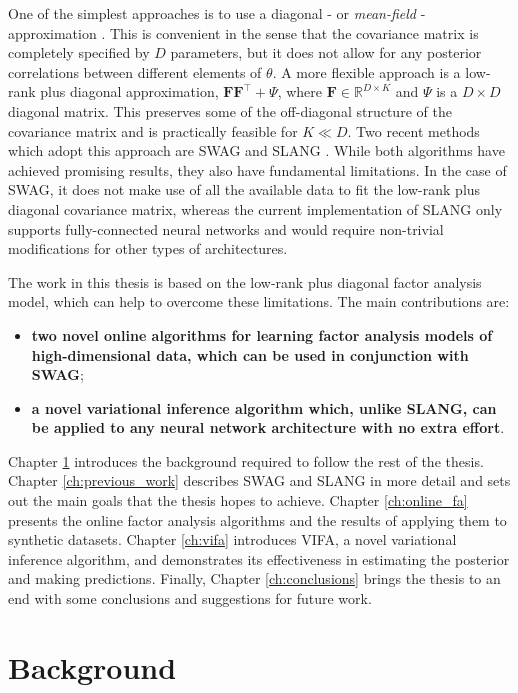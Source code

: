 \documentclass[msc,deptreport.inf]{infthesis} %
\newcommand{\matr}[1]{\mathbf{#1}}
\newcommand{\R}{\mathbb R}
\begin{document}
One of the simplest approaches is to use a diagonal - or \emph{mean-field} - approximation \cite{blundell2015, graves2011, hernandez2015, tangkaratt2018, ranganath2014}. This is convenient in the sense that the covariance matrix is completely specified by $D$ parameters, but it does not allow for any posterior correlations between different elements of $\theta$. A more flexible approach is a low-rank plus diagonal approximation, $\matr{F}\matr{F}^\intercal + \Psi$, where $\matr{F} \in \R^{D\times K}$ and $\Psi$ is a $D \times D$ diagonal matrix. This preserves some of the off-diagonal structure of the covariance matrix and is practically feasible for $K \ll D$. Two recent methods which adopt this approach are SWAG \cite{maddox2019} and SLANG \cite{mishkin2018}. While both algorithms have achieved promising results, they also have fundamental limitations. In the case of SWAG, it does not make use of all the available data to fit the low-rank plus diagonal covariance matrix, whereas the current implementation of SLANG only supports fully-connected neural networks and would require non-trivial modifications for other types of architectures.

The work in this thesis is based on the low-rank plus diagonal factor analysis model, which can help to overcome these limitations. The main contributions are:
\begin{itemize}
	\item \textbf{two novel online algorithms for learning factor analysis models of high-dimensional data, which can be used in conjunction with SWAG};
	\item \textbf{a novel variational inference algorithm which, unlike SLANG, can be applied to any neural network architecture with no extra effort}. 
\end{itemize} 
Chapter \ref{ch:background} introduces the background required to follow the rest of the thesis. Chapter \ref{ch:previous_work} describes SWAG and SLANG in more detail and sets out the main goals that the thesis hopes to achieve. Chapter \ref{ch:online_fa} presents the online factor analysis algorithms and the results of applying them to synthetic datasets. Chapter \ref{ch:vifa} introduces VIFA, a novel variational inference algorithm, and demonstrates its effectiveness in estimating the posterior and making predictions. Finally, Chapter \ref{ch:conclusions} brings the thesis to an end with some conclusions and suggestions for future work. 


\chapter{Background}\label{ch:background}
\end{document}
